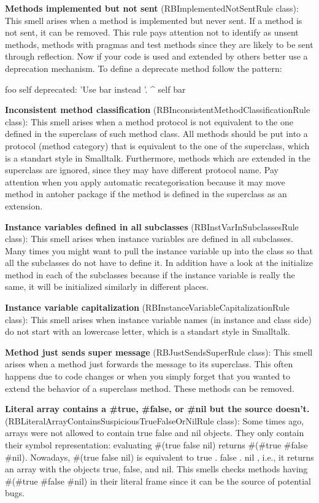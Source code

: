 \textbf{Methods implemented but not sent} (RBImplementedNotSentRule class): This smell arises when a method is implemented but never sent. If a method is not sent, it can be removed. This rule pays attention not to identify as unsent methods, methods with pragmas and test methods since they are likely to be sent through reflection.
	Now if your code is used and extended by others better use a deprecation mechanism. To define a deprecate method follow the pattern: 
	
	foo
		self deprecated: 'Use bar instead '. 
		^ self bar
		 

\textbf{Inconsistent method classification} (RBInconsistentMethodClassificationRule class): This smell arises when a method protocol is not equivalent to the one defined in the superclass of such method class. All methods should be put into a protocol (method category) that is equivalent to the one of the superclass, which is a standart style in Smalltalk. Furthermore, methods which are extended in the superclass are ignored, since they may have different protocol name. Pay attention when you apply automatic recategorisation because it may move method in antoher package if the method is defined in the superclass as an extension.

\textbf{Instance variables defined in all subclasses} (RBInstVarInSubclassesRule class): This smell arises when instance variables are defined in all subclasses. Many times you might want to pull the instance variable up into the class so that all the subclasses do not have to define it. In addition have a look at the initialize method in each of the subclasses because if the instance variable is really the same, it will be initialized similarly in different places.

\textbf{Instance variable capitalization} (RBInstanceVariableCapitalizationRule class): This smell arises when instance variable names (in instance and class side) do not start with an lowercase letter, which is a standart style in Smalltalk.

\textbf{Method just sends super message} (RBJustSendsSuperRule class): This smell arises when a method just forwards the message to its superclass. This often happens due to code changes or when you simply forget that you wanted to extend the behavior of a superclass method. These methods can be removed.

\textbf{Literal array contains a #true, #false, or #nil but the source doesn't.} (RBLiteralArrayContainsSuspiciousTrueFalseOrNilRule class): Some times ago, arrays were not allowed to contain true false and nil objects. They only contain their symbol representation: evaluating \#(true false nil) returns \#(\#true \#false \#nil). 
	Nowadays, \#(true false nil) is equivalent to {true . false . nil }, i.e., it returns an array with the objects true, false, and nil. 
	This smells checks methods having \#(\#true \#false \#nil) in their literal frame since it can be the source of potential bugs. 
	 

